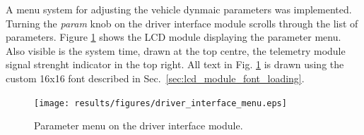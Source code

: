 A menu system for adjusting the vehicle dynmaic parameters was implemented. Turning the \emph{param} knob on the driver interface module scrolls through the list of parameters. Figure \ref{fig:driver_interface_menu} shows the LCD module displaying the parameter menu. Also visible is the system time, drawn at the top centre, the telemetry module signal strenght indicator in the top right. All text in Fig. \ref{fig:driver_interface_menu} is drawn using the custom 16x16 font described in Sec.\ \ref{sec:lcd_module_font_loading}.

\begin{figure}[h!]
 \centering
 \texttt{[image: results/figures/driver\_interface\_menu.eps]}
 \caption{Parameter menu on the driver interface module.}
 \label{fig:driver_interface_menu}
\end{figure}